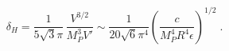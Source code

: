 \begin{equation}
\delta_H = \frac{1}{5\sqrt{3} \pi} \, \frac{V^{3/2}}{M_P^3 V'}\sim \frac{1}{20\sqrt{6} \pi^4}
\left( \frac{c}{M_P^4  R^4 \epsilon} \right)^{1/2} \;.
\end{equation}

